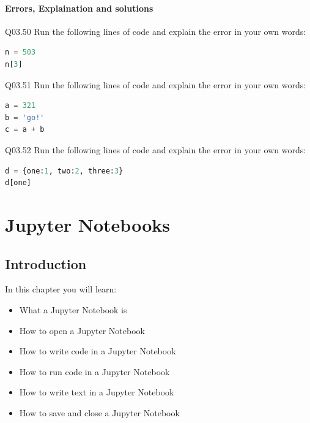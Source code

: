 \documentclass{book}
\newenvironment{problems}{}{}  %
\begin{document}
    
        \begin{problems}
        \subsubsection{Errors, Explaination and
solutions}\label{errors-explaination-and-solutions}

Q03.50 Run the following lines of code and explain the error in your own
words:

\begin{lstlisting}[language=Python]
n = 503
n[3]
\end{lstlisting}

Q03.51 Run the following lines of code and explain the error in your own
words:

\begin{lstlisting}[language=Python]
a = 321
b = 'go!'
c = a + b
\end{lstlisting}

Q03.52 Run the following lines of code and explain the error in your own
words:

\begin{lstlisting}[language=Python]
d = {one:1, two:2, three:3}
d[one]
\end{lstlisting}
        \end{problems}

    




    
        \chapter{Jupyter Notebooks}\label{jupyter-notebooks}
    




    
        \section{Introduction}\label{introduction}
    




    
        In this chapter you will learn:

\begin{itemize}
\item
  What a Jupyter Notebook is
\item
  How to open a Jupyter Notebook
\item
  How to write code in a Jupyter Notebook
\item
  How to run code in a Jupyter Notebook
\item
  How to write text in a Jupyter Notebook
\item
  How to save and close a Jupyter Notebook
\end{itemize}
        \newpage
\end{document}
